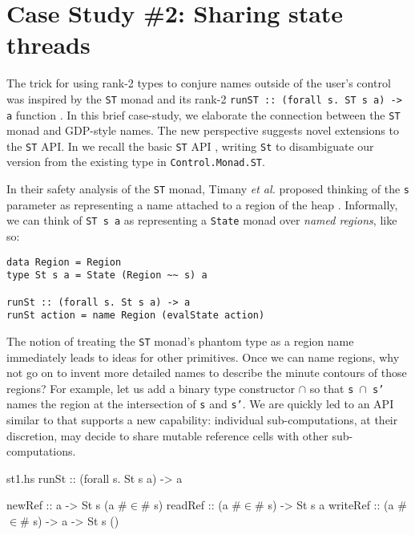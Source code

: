 \documentclass[format=sigplan, review=false, screen=true]{acmart}
\begin{document}

\section{Case Study \#2: Sharing state threads}
The trick for using rank-2 types to conjure names outside of the user's control was
inspired by the \texttt{ST} monad and its rank-2 \texttt{runST :: (forall s. ST s a) -> a}
function \cite{launchbury1994lazy}. In this brief case-study, we elaborate the connection
between the \texttt{ST} monad and GDP-style names. The new perspective suggests novel
extensions to the \texttt{ST} API.
In  we recall the basic \texttt{ST} API \cite{launchbury1994lazy}, writing \texttt{St} to
disambiguate our version from the existing type in \texttt{Control.Monad.ST}.

In their safety analysis of the \texttt{ST} monad, Timany \textit{et al.} proposed thinking of the \texttt{s} parameter as
representing a name attached to a region of the heap \cite{timany2017logical}.
Informally, we can think of \texttt{ST s a} as representing a \texttt{State} monad over
\emph{named regions}, like so:
\begin{verbatim}
data Region = Region
type St s a = State (Region ~~ s) a

runSt :: (forall s. St s a) -> a
runSt action = name Region (evalState action)
\end{verbatim}

The notion of treating the \texttt{ST} monad's phantom type as a region name immediately leads to ideas for
other primitives. Once we can name regions, why not go on to invent more detailed names to describe
the minute contours of those regions? For example, let us add a binary type constructor $\cap$ so that \texttt{s $\cap$ s'}
names the region at the intersection of \texttt{s} and \texttt{s'}. We are quickly led to an API similar to  that
supports a new capability: individual sub-computations, at their discretion, may decide to share mutable reference cells with other sub-computations.



\begin{filecontents*}{st1.hs}
runSt    :: (forall s. St s a) -> a

newRef   :: a -> St s (a #$\in$# s)
readRef  :: (a #$\in$# s) -> St s a
writeRef :: (a #$\in$# s) -> a -> St s ()
\end{filecontents*}
\end{document}
